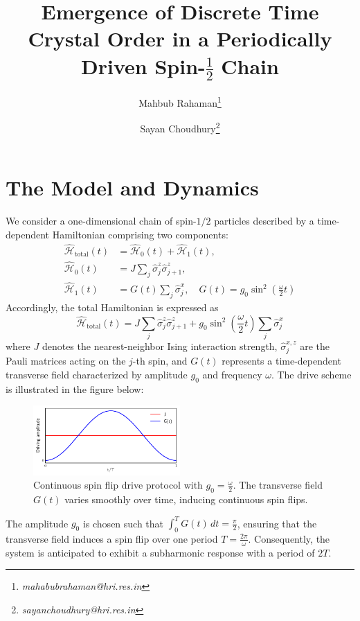 \documentclass[a4paper, 11pt]{article}
\title{Emergence of Discrete Time Crystal Order in a Periodically Driven Spin-$\frac{1}{2}$ Chain}
\author[1]{Mahbub Rahaman\thanks{\textit{mahabubrahaman@hri.res.in}}}
\author[1]{Sayan Choudhury\thanks{\textit{sayanchoudhury@hri.res.in}}}
\affil[1]{\small Harish-Chandra Research Institute, HBNI, Chhatnag Road, Jhunsi, Praygraj, UP - 211019, India}
\date{}
\begin{document}
\maketitle

\section{The Model and Dynamics}
We consider a one-dimensional chain of spin-$1/2$ particles described by a time-dependent Hamiltonian comprising two components:
\begin{align}
    \hat{\mathcal{H}}_{\text{total}}(t) &=  \hat{\mathcal{H}}_0(t) + \hat{\mathcal{H}}_1(t), \\
    \hat{\mathcal{H}}_0(t) &= J\sum_{j} \hat{\sigma}_j^z \hat{\sigma}_{j+1}^z, \\
    \hat{\mathcal{H}}_1(t) &= G(t)\sum_{j}\hat{\sigma}_j^x, \quad G(t) = g_0\sin^2\left(\frac{\omega}{2} t\right)
\end{align}
Accordingly, the total Hamiltonian is expressed as
\begin{equation}
    \boxed{
        \hat{\mathcal{H}}_{\text{total}}(t) =  J\sum_{j} \hat{\sigma}_j^z \hat{\sigma}_{j+1}^z + g_0\sin^2\left(\frac{\omega}{2} t\right)\sum_{j}\hat{\sigma}_j^x
    }
\end{equation}
where $J$ denotes the nearest-neighbor Ising interaction strength, $\hat{\sigma}_j^{x,z}$ are the Pauli matrices acting on the $j$-th spin, and $G(t)$ represents a time-dependent transverse field characterized by amplitude $g_0$ and frequency $\omega$. 
The drive scheme is illustrated in the figure below:
\begin{figure}[h!]
    \centering
    \includegraphics[width=0.5\textwidth]{continuous_flip_drive.pdf}
    \caption{Continuous spin flip drive protocol with $g_0 = \frac{\omega}{2}$. The transverse field $G(t)$ varies smoothly over time, inducing continuous spin flips.}
\end{figure}
The amplitude $g_0$ is chosen such that $\displaystyle \int_0^T G(t)\,dt = \frac{\pi}{2}$, ensuring that the transverse field induces a spin flip over one period $T = \frac{2\pi}{\omega}$. Consequently, the system is anticipated to exhibit a subharmonic response with a period of $2T$.
\end{document}
